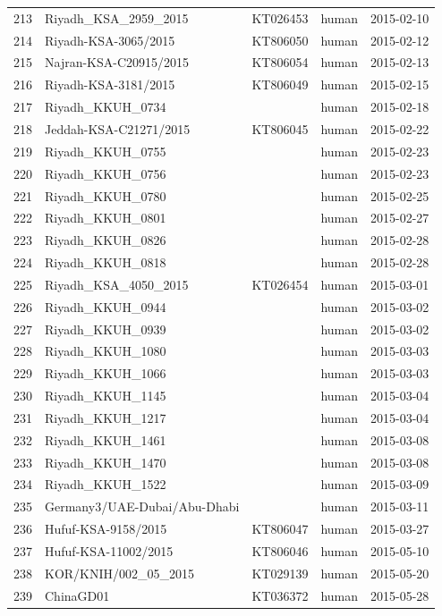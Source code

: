 \documentclass[9pt,lineno]{elife}
\begin{document}
\begin{longtable}{ | r | l | p{2cm} | l | l | }
  213 & Riyadh\_KSA\_2959\_2015 & KT026453 & human & 2015-02-10 \\
  214 & Riyadh-KSA-3065/2015 & KT806050 & human & 2015-02-12 \\
  215 & Najran-KSA-C20915/2015 & KT806054 & human & 2015-02-13 \\
  216 & Riyadh-KSA-3181/2015 & KT806049 & human & 2015-02-15 \\
  217 & Riyadh\_KKUH\_0734 &  & human & 2015-02-18 \\
  218 & Jeddah-KSA-C21271/2015 & KT806045 & human & 2015-02-22 \\
  219 & Riyadh\_KKUH\_0755 &  & human & 2015-02-23 \\
  220 & Riyadh\_KKUH\_0756 &  & human & 2015-02-23 \\
  221 & Riyadh\_KKUH\_0780 &  & human & 2015-02-25 \\
  222 & Riyadh\_KKUH\_0801 &  & human & 2015-02-27 \\
  223 & Riyadh\_KKUH\_0826 &  & human & 2015-02-28 \\
  224 & Riyadh\_KKUH\_0818 &  & human & 2015-02-28 \\
  225 & Riyadh\_KSA\_4050\_2015 & KT026454 & human & 2015-03-01 \\
  226 & Riyadh\_KKUH\_0944 &  & human & 2015-03-02 \\
  227 & Riyadh\_KKUH\_0939 &  & human & 2015-03-02 \\
  228 & Riyadh\_KKUH\_1080 &  & human & 2015-03-03 \\
  229 & Riyadh\_KKUH\_1066 &  & human & 2015-03-03 \\
  230 & Riyadh\_KKUH\_1145 &  & human & 2015-03-04 \\
  231 & Riyadh\_KKUH\_1217 &  & human & 2015-03-04 \\
  232 & Riyadh\_KKUH\_1461 &  & human & 2015-03-08 \\
  233 & Riyadh\_KKUH\_1470 &  & human & 2015-03-08 \\
  234 & Riyadh\_KKUH\_1522 &  & human & 2015-03-09 \\
  235 & Germany3/UAE-Dubai/Abu-Dhabi &  & human & 2015-03-11 \\
  236 & Hufuf-KSA-9158/2015 & KT806047 & human & 2015-03-27 \\
  237 & Hufuf-KSA-11002/2015 & KT806046 & human & 2015-05-10 \\
  238 & KOR/KNIH/002\_05\_2015 & KT029139 & human & 2015-05-20 \\
  239 & ChinaGD01 & KT036372 & human & 2015-05-28 \\

\end{longtable}
\end{document}
